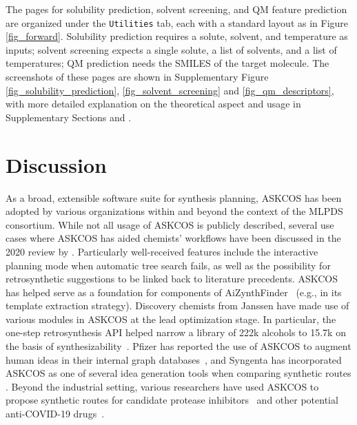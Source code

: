 \documentclass[pdflatex,sn-mathphys-num]{sn-jnl}%
\theoremstyle{thmstyleone}%
\theoremstyle{thmstyletwo}%
\theoremstyle{thmstylethree}%
\begin{document}
The pages for solubility prediction, solvent screening, and QM feature prediction are organized under the \texttt{Utilities} tab, each with a standard layout as in Figure \ref{fig_forward}. Solubility prediction requires a solute,  solvent, and temperature as inputs; solvent screening expects a single solute, a list of solvents, and a list of temperatures; QM prediction needs the SMILES of the target molecule. The screenshots of these pages are shown in Supplementary Figure \ref{fig_solubility_prediction}, \ref{fig_solvent_screening} and \ref{fig_qm_descriptors}, with more detailed explanation on the theoretical aspect and usage in Supplementary Sections  and .

\section{Discussion}\label{discussion}



As a broad, extensible software suite for synthesis planning, ASKCOS has been adopted by various organizations within and beyond the context of the MLPDS consortium. While not all usage of ASKCOS is publicly described, several use cases where ASKCOS has aided chemists' workflows have been discussed in the 2020 review by \citet{struble_current_2020}. Particularly well-received features include the interactive planning mode when automatic tree search fails, as well as the possibility for retrosynthetic suggestions to be linked back to literature precedents. ASKCOS has helped serve as a foundation for components of AiZynthFinder~\citep{genheden_aizynthfinder_2020,shields_aizynth_2024} (e.g., in its template extraction strategy). Discovery chemists from Janssen have made use of various modules in ASKCOS at the lead optimization stage. In particular, the one-step retrosynthesis API helped narrow a library of 222k alcohols to 15.7k on the basis of synthesizability~\citep{seierstad_novel_2021}. Pfizer has reported the use of ASKCOS to augment human ideas in their internal graph databases~\citep{avila_chemistry_2024}, and Syngenta has incorporated ASKCOS as one of several idea generation tools when comparing synthetic routes \cite{pasquini2023linchemin}. Beyond the industrial setting, various researchers have used ASKCOS to propose synthetic routes for candidate protease inhibitors~\citep{soukaina_design_2024} and other potential anti-COVID-19 drugs~\citep{qi_optimized_2023}.
\end{document}
